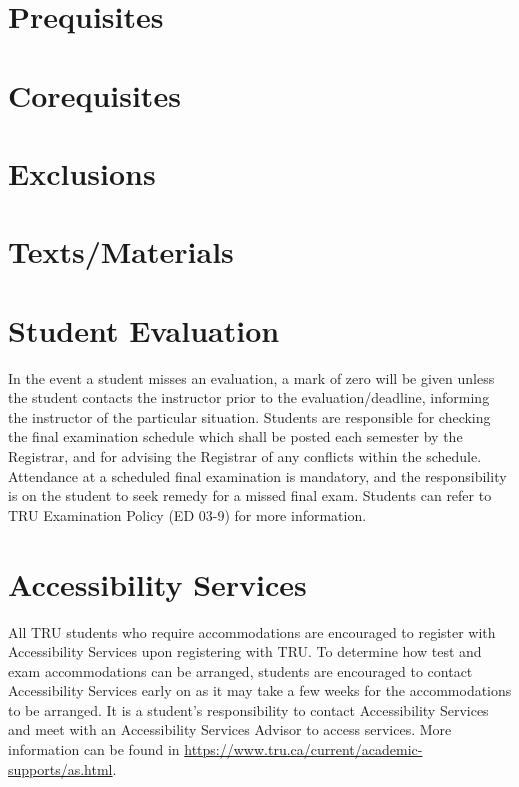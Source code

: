 \documentclass[10pt]{trumathoutline}
\begin{document}
\section*{Prequisites}
\courseprerequisites

\section*{Corequisites}
\coursecorequisites

\section*{Exclusions}
\courseexclusions

\section*{Texts/Materials}
\textsmaterials

\section*{Student Evaluation}
\begin{minipage}{\textwidth}
\evaluation
\end{minipage}


In the event a student misses an evaluation, a mark of zero will be given unless the student contacts the instructor prior to the evaluation/deadline, informing the instructor of the particular situation. Students are responsible for checking the final examination schedule which shall be posted each semester by the Registrar, and for advising the Registrar of any conflicts within the schedule. Attendance at a scheduled final examination is mandatory, and the responsibility is on the student to seek remedy for a missed final exam. Students can refer to TRU Examination Policy (ED 03-9) for more information.


\section*{Accessibility Services}
All TRU students who require accommodations are encouraged to register with Accessibility Services upon registering with TRU. To determine how test and exam accommodations can be arranged, students are encouraged to contact Accessibility Services early on as it may take a few weeks for the accommodations to be arranged. It is a student's responsibility to contact Accessibility Services and meet with an Accessibility Services Advisor to access services. More information can be found in
\href{https://www.tru.ca/current/academic-supports/as.html}{https://www.tru.ca/current/academic-supports/as.html}.
\end{document}
